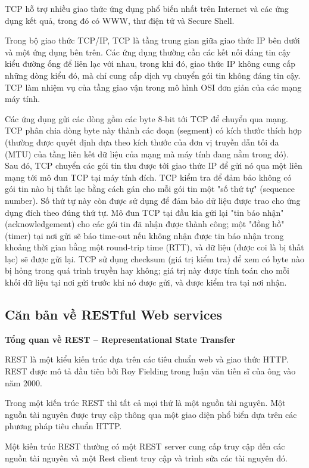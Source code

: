 TCP hỗ trợ nhiều giao thức ứng dụng phổ biến nhất trên Internet và các ứng dụng kết quả, trong đó có WWW, thư điện tử và Secure Shell.

Trong bộ giao thức TCP/IP, TCP là tầng trung gian giữa giao thức IP bên dưới và một ứng dụng bên trên. Các ứng dụng thường cần các kết nối đáng tin cậy kiểu đường ống để liên lạc với nhau, trong khi đó, giao thức IP không cung cấp những dòng kiểu đó, mà chỉ cung cấp dịch vụ chuyển gói tin không đáng tin cậy. TCP làm nhiệm vụ của tầng giao vận trong mô hình OSI đơn giản của các mạng máy tính.

Các ứng dụng gửi các dòng gồm các byte 8-bit tới TCP để chuyển qua mạng. TCP phân chia dòng byte này thành các đoạn (segment) có kích thước thích hợp (thường được quyết định dựa theo kích thước của đơn vị truyền dẫn tối đa (MTU) của tầng liên kết dữ liệu của mạng mà máy tính đang nằm trong đó). Sau đó, TCP chuyển các gói tin thu được tới giao thức IP để gửi nó qua một liên mạng tới mô đun TCP tại máy tính đích. TCP kiểm tra để đảm bảo không có gói tin nào bị thất lạc bằng cách gán cho mỗi gói tin một "số thứ tự" (sequence number). Số thứ tự này còn được sử dụng để đảm bảo dữ liệu được trao cho ứng dụng đích theo đúng thứ tự. Mô đun TCP tại đầu kia gửi lại "tin báo nhận" (acknowledgement) cho các gói tin đã nhận được thành công; một "đồng hồ" (timer) tại nơi gửi sẽ báo time-out nếu không nhận được tin báo nhận trong khoảng thời gian bằng một round-trip time (RTT), và dữ liệu (được coi là bị thất lạc) sẽ được gửi lại. TCP sử dụng checksum (giá trị kiểm tra) để xem có byte nào bị hỏng trong quá trình truyền hay không; giá trị này được tính toán cho mỗi khối dữ liệu tại nơi gửi trước khi nó được gửi, và được kiểm tra tại nơi nhận.

\subsection{Căn bản về RESTful Web services}

\textbf{Tổng quan về REST – Representational State Transfer}

REST là một kiểu kiến trúc dựa trên các tiêu chuẩn web và giao thức HTTP. REST được mô tả đầu tiên bởi Roy Fielding trong luận văn tiến sĩ của ông vào năm 2000.

Trong một kiến trúc REST thì tất cả mọi thứ là một nguồn tài nguyên. Một nguồn tài nguyên được truy cập thông qua một giao diện phổ biển dựa trên các phương pháp tiêu chuẩn HTTP.

Một kiến trúc REST thường có một REST server cung cấp truy cập đến các nguồn tài nguyên và một Rest client truy cập và trình sửa các tài nguyên đó.

